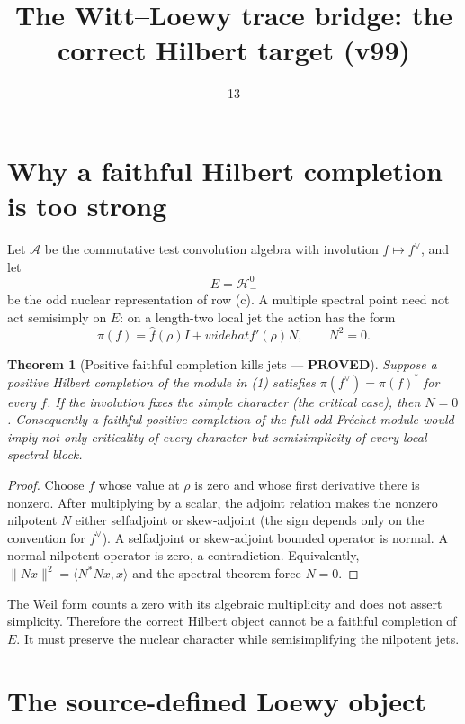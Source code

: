 \documentclass[11pt]{article}
\title{The Witt--Loewy trace bridge: the correct Hilbert target (v99)}
\date{13}
\newcommand{\PROVED}{\textcolor{green!40!black}{\textbf{PROVED}}}
\newtheorem{theorem}{Theorem}
\begin{document}
\maketitle

\section{Why a faithful Hilbert completion is too strong}

Let $\mathcal A$ be the commutative test convolution algebra with involution
$f\mapsto f^\vee$, and let
\[
 E=\mathcal H_-^0
\]
be the odd nuclear representation of row (c).  A multiple spectral point
need not act semisimply on $E$: on a length-two local jet the action has
the form
\begin{equation}
             \pi(f)=\widehat f(\rho)I+widehat f'(\rho)N,
 \qquad N^2=0.                                      \tag{1}
\end{equation}

\begin{theorem}[Positive faithful completion kills jets --- \PROVED]
Suppose a positive Hilbert completion of the module in (1) satisfies
$\pi(f^\vee)=\pi(f)^*$ for every $f$.  If the involution fixes the simple
character (the critical case), then $N=0$.  Consequently a faithful
positive completion of the full odd Fr\'echet module would imply not only
criticality of every character but semisimplicity of every local spectral
block.
\end{theorem}

\begin{proof}
Choose $f$ whose value at $\rho$ is zero and whose first derivative there
is nonzero.  After multiplying by a scalar, the adjoint relation makes the
nonzero nilpotent $N$ either selfadjoint or skew-adjoint (the sign depends
only on the convention for $f^\vee$).  A selfadjoint or skew-adjoint
bounded operator is normal.  A normal nilpotent operator is zero, a
contradiction.  Equivalently, $\|N x\|^2=\langle N^*Nx,x\rangle$ and the
spectral theorem force $N=0$.
\end{proof}

The Weil form counts a zero with its algebraic multiplicity and does not
assert simplicity.  Therefore the correct Hilbert object cannot be a
faithful completion of $E$.  It must preserve the nuclear character while
semisimplifying the nilpotent jets.

\section{The source-defined Loewy object}
\end{document}
